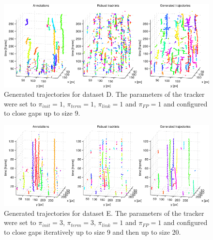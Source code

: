 \begin{figure}[h]
	\includegraphics[width=\textwidth]{images/fig_results_tracker_dataset_4}
	\caption{Generated trajectories for dataset D. The parameters of the tracker were set to $\pi_{init}=1$, $\pi_{term}=1$, $\pi_{link}=1$ and $\pi_{FP}=1$ and configured to close gaps up to size 9. }
	\label{fig:results_tracker_dataset_4}
\end{figure}
\begin{figure}[h]
	\includegraphics[width=\textwidth]{images/fig_results_tracker_dataset_5}
	\caption{Generated trajectories for dataset E. The parameters of the tracker were set to $\pi_{init}=3$, $\pi_{term}=3$, $\pi_{link}=1$ and $\pi_{FP}=1$ and configured to close gaps iteratively up to size 9 and then up to size 20.}
	\label{fig:results_tracker_dataset_5}
\end{figure}			